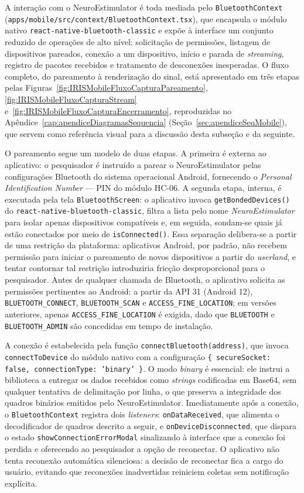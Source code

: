 A interação com o NeuroEstimulator é toda mediada pelo \texttt{BluetoothContext} (\texttt{apps/mobile/src/context/BluetoothContext.tsx}), que encapsula o módulo nativo \texttt{react-native-bluetooth-classic} \cite{reactNativeBCDocs} e expõe à interface um conjunto reduzido de operações de alto nível: solicitação de permissões, listagem de dispositivos pareados, conexão a um dispositivo, início e parada de \textit{streaming}, registro de pacotes recebidos e tratamento de desconexões inesperadas. O fluxo completo, do pareamento à renderização do sinal, está apresentado em três etapas pelas Figuras~\ref{fig:IRISMobileFluxoCapturaPareamento}, \ref{fig:IRISMobileFluxoCapturaStream} e~\ref{fig:IRISMobileFluxoCapturaEncerramento}, reproduzidas no Apêndice~\ref{cap:apendiceDiagramasSequencia} (Seção~\ref{sec:apendiceSeqMobile}), que servem como referência visual para a discussão desta subseção e da seguinte.

O pareamento segue um modelo de duas etapas. A primeira é externa ao aplicativo: o pesquisador é instruído a parear o NeuroEstimulator pelas configurações Bluetooth do sistema operacional Android, fornecendo o \textit{Personal Identification Number} --- PIN do módulo HC-06. A segunda etapa, interna, é executada pela tela \texttt{BluetoothScreen}: o aplicativo invoca \texttt{getBondedDevices()} do \texttt{react-native-bluetooth-classic}, filtra a lista pelo nome \textit{NeuroEstimulator} para isolar apenas dispositivos compatíveis e, em seguida, sondam-se quais já estão conectados por meio de \texttt{isConnected()}. Essa separação delibera-se a partir de uma restrição da plataforma: aplicativos Android, por padrão, não recebem permissão para iniciar o pareamento de novos dispositivos a partir do \textit{userland}, e tentar contornar tal restrição introduziria fricção desproporcional para o pesquisador. Antes de qualquer chamada de Bluetooth, o aplicativo solicita as permissões pertinentes ao Android: a partir da API 31 (Android 12), \texttt{BLUETOOTH\_CONNECT}, \texttt{BLUETOOTH\_SCAN} e \texttt{ACCESS\_FINE\_LOCATION}; em versões anteriores, apenas \texttt{ACCESS\_FINE\_LOCATION} é exigida, dado que \texttt{BLUETOOTH} e \texttt{BLUETOOTH\_ADMIN} são concedidas em tempo de instalação.

A conexão é estabelecida pela função \texttt{connectBluetooth(address)}, que invoca \texttt{connectToDevice} do módulo nativo com a configuração \texttt{\{ secureSocket: false, connectionType: 'binary' \}}. O modo \textit{binary} é essencial: ele instrui a biblioteca a entregar os dados recebidos como \textit{strings} codificadas em Base64, sem qualquer tentativa de delimitação por linha, o que preserva a integridade dos quadros binários emitidos pelo NeuroEstimulator. Imediatamente após a conexão, o \texttt{BluetoothContext} registra dois \textit{listeners}: \texttt{onDataReceived}, que alimenta o decodificador de quadros descrito a seguir, e \texttt{onDeviceDisconnected}, que dispara o estado \texttt{showConnectionErrorModal} sinalizando à interface que a conexão foi perdida e oferecendo ao pesquisador a opção de reconectar. O aplicativo não tenta reconexão automática silenciosa: a decisão de reconectar fica a cargo do usuário, evitando que reconexões inadvertidas reiniciem coletas sem notificação explícita.

